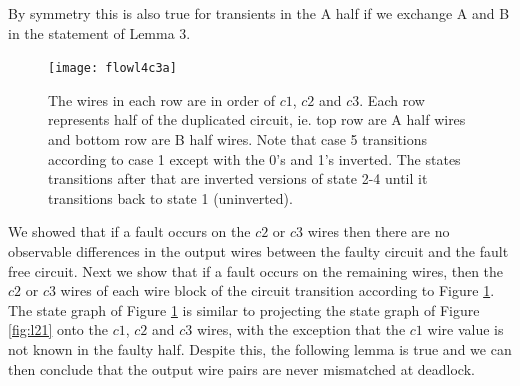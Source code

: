 \documentclass[12pt]{report}
\begin{document}
By symmetry this is also true for transients in the A half if we exchange A and B in the statement of Lemma 3.\\

\begin{figure}
  \centering
    \texttt{[image: flowl4c3a]}
  \caption{The wires in each row are in order of $c1$, $c2$ and $c3$.  Each row represents half of the duplicated circuit, ie. top row are A half wires and bottom row are B half wires.  Note that case 5 transitions according to case 1 except with the 0's and 1's inverted.  The states transitions after that are inverted versions of state 2-4 until it transitions back to state 1 (uninverted).}
  \label{fig:l4}
\end{figure}

We showed that if a fault occurs on the $c2$ or $c3$ wires then there are no observable differences in the output wires between the faulty circuit and the fault free circuit.  
Next we show that if a fault occurs on the remaining wires, then the $c2$ or $c3$ wires of each wire block of the circuit transition according to Figure \ref{fig:l4}.  The state graph of Figure \ref{fig:l4} is similar to projecting the state graph of Figure \ref{fig:l21} onto the $c1$, $c2$ and $c3$ wires, with the exception that the $c1$ wire value is not known in the faulty half.  Despite this, the following lemma is true and we can then conclude that the output wire pairs are never mismatched at deadlock.  
\end{document}
